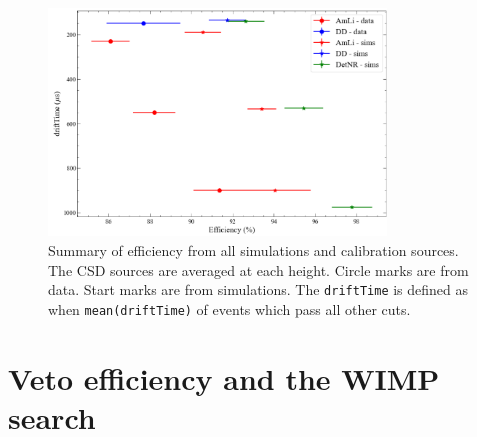 \begin{figure}
	\centering
	\includegraphics[width=0.8\textwidth]{figures/VetoEfficiency/efficiency_summary.png}
	\caption{Summary of efficiency from all simulations and calibration sources.
		The CSD sources are averaged at each height.
		Circle marks are from data.
		Start marks are from simulations.
		The \lstinline{driftTime} is defined as when \lstinline{mean(driftTime)} of events which pass all other cuts.
	}
	\label{fig:efficiency_summary}
\end{figure}
\section{Veto efficiency and the WIMP search}
